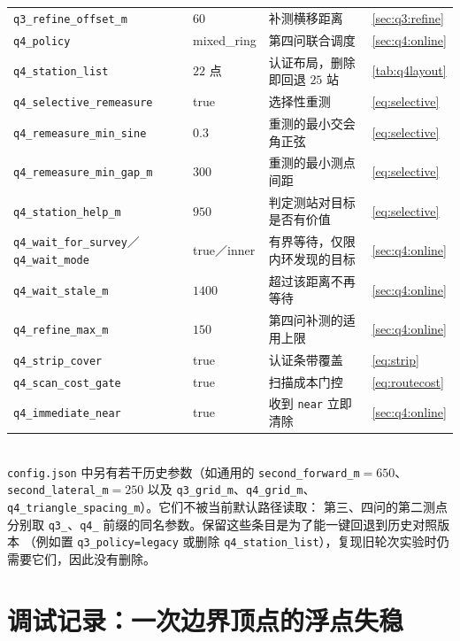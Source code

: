 \begin{appendices}
\begin{table}[H]
\begin{tabularx}{\textwidth}{@{}l l L l@{}}
    \texttt{q3\_refine\_offset\_m}    & $60$     & 补测横移距离 & \cref{sec:q3:refine} \\
    \texttt{q4\_policy}               & mixed\_ring & 第四问联合调度 & \cref{sec:q4:online} \\
    \texttt{q4\_station\_list}        & $22$ 点  & 认证布局，删除即回退 $25$ 站 & \cref{tab:q4layout} \\
    \texttt{q4\_selective\_remeasure} & true     & 选择性重测 & \cref{eq:selective} \\
    \texttt{q4\_remeasure\_min\_sine} & $0.3$    & 重测的最小交会角正弦 & \cref{eq:selective} \\
    \texttt{q4\_remeasure\_min\_gap\_m}& $300$   & 重测的最小测点间距 & \cref{eq:selective} \\
    \texttt{q4\_station\_help\_m}     & $950$    & 判定测站对目标是否有价值 & \cref{eq:selective} \\
    \texttt{q4\_wait\_for\_survey}／\texttt{q4\_wait\_mode} & true／inner & 有界等待，仅限内环发现的目标 & \cref{sec:q4:online} \\
    \texttt{q4\_wait\_stale\_m}       & $1400$   & 超过该距离不再等待 & \cref{sec:q4:online} \\
    \texttt{q4\_refine\_max\_m}       & $150$    & 第四问补测的适用上限 & \cref{sec:q4:online} \\
    \texttt{q4\_strip\_cover}         & true     & 认证条带覆盖 & \cref{eq:strip} \\
    \texttt{q4\_scan\_cost\_gate}     & true     & 扫描成本门控 & \cref{eq:routecost} \\
    \texttt{q4\_immediate\_near}      & true     & 收到 \texttt{near} 立即清除 & \cref{sec:q4:online} \\
    \bottomrule[1.5pt]
  \end{tabularx}\\[2pt]
  \small \texttt{config.json} 中另有若干历史参数（如通用的 \texttt{second\_forward\_m}$=650$、\texttt{second\_lateral\_m}$=250$
  以及 \texttt{q3\_grid\_m}、\texttt{q4\_grid\_m}、\texttt{q4\_triangle\_spacing\_m}）。它们不被当前默认路径读取：
  第三、四问的第二测点分别取 \texttt{q3\_}、\texttt{q4\_} 前缀的同名参数。保留这些条目是为了能一键回退到历史对照版本
  （例如置 \texttt{q3\_policy=legacy} 或删除 \texttt{q4\_station\_list}），复现旧轮次实验时仍需要它们，因此没有删除。
\end{table}

\section{调试记录：一次边界顶点的浮点失稳}\label{app:debug}


\end{appendices}
